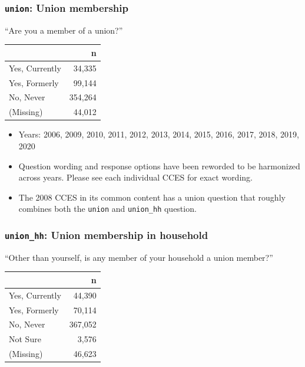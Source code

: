 \documentclass[10pt,article,oneside]{memoir}
\theoremstyle{definition}
\begin{document}
\hypertarget{union-union-membership}{%
\subsubsection{\texorpdfstring{\texttt{union}: Union
membership}{union: Union membership}}\label{union-union-membership}}

``Are you a member of a union?''

\begin{table}[H]
\centering
\begin{tabular}{lr}
\toprule
 & n\\
\midrule
Yes, Currently & 34,335\\
Yes, Formerly & 99,144\\
No, Never & 354,264\\
(Missing) & 44,012\\
\bottomrule
\end{tabular}
\end{table}

\begin{itemize}
\tightlist
\item
  Years: 2006, 2009, 2010, 2011, 2012, 2013, 2014, 2015, 2016, 2017,
  2018, 2019, 2020
\item
  Question wording and response options have been reworded to be
  harmonized across years. Please see each individual CCES for exact
  wording.
\item
  The 2008 CCES in its common content has a union question that roughly
  combines both the \texttt{union} and \texttt{union\_hh} question.
\end{itemize}

\hypertarget{union_hh-union-membership-in-household}{%
\subsubsection{\texorpdfstring{\texttt{union\_hh}: Union membership in
household}{union\_hh: Union membership in household}}\label{union_hh-union-membership-in-household}}

``Other than yourself, is any member of your household a union member?''

\begin{table}[H]
\centering
\begin{tabular}{lr}
\toprule
 & n\\
\midrule
Yes, Currently & 44,390\\
Yes, Formerly & 70,114\\
No, Never & 367,052\\
Not Sure & 3,576\\
(Missing) & 46,623\\
\bottomrule
\end{tabular}
\end{table}
\end{document}
